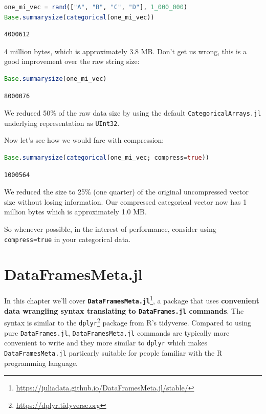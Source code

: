 \documentclass[
  notoc %
]{tufte-book}
\DeclareRobustCommand{\href}[2]{#2\footnote{\url{#1}}}
\newcommand{\passthrough}[1]{#1}
\begin{document}
\begin{lstlisting}[language=Julia]
one_mi_vec = rand(["A", "B", "C", "D"], 1_000_000)
Base.summarysize(categorical(one_mi_vec))
\end{lstlisting}

\begin{lstlisting}
4000612
\end{lstlisting}

4 million bytes, which is approximately 3.8 MB. Don't get us wrong, this
is a good improvement over the raw string size:

\begin{lstlisting}[language=Julia]
Base.summarysize(one_mi_vec)
\end{lstlisting}

\begin{lstlisting}
8000076
\end{lstlisting}

We reduced 50\% of the raw data size by using the default
\passthrough{\lstinline!CategoricalArrays.jl!} underlying representation
as \passthrough{\lstinline!UInt32!}.

Now let's see how we would fare with compression:

\begin{lstlisting}[language=Julia]
Base.summarysize(categorical(one_mi_vec; compress=true))
\end{lstlisting}

\begin{lstlisting}
1000564
\end{lstlisting}

We reduced the size to 25\% (one quarter) of the original uncompressed
vector size without losing information. Our compressed categorical
vector now has 1 million bytes which is approximately 1.0 MB.

So whenever possible, in the interest of performance, consider using
\passthrough{\lstinline!compress=true!} in your categorical data.

\hypertarget{sec:dataframesmeta}{%
\chapter{DataFramesMeta.jl}\label{sec:dataframesmeta}}

In this chapter we'll cover
\href{https://juliadata.github.io/DataFramesMeta.jl/stable/}{\textbf{\passthrough{\lstinline!DataFramesMeta.jl!}}},
a package that uses \textbf{convenient data wrangling syntax translating
to \passthrough{\lstinline!DataFrames.jl!} commands}. The syntax is
similar to the
\href{https://dplyr.tidyverse.org}{\passthrough{\lstinline!dplyr!}}
package from R's tidyverse. Compared to using pure
\passthrough{\lstinline!DataFrames.jl!},
\passthrough{\lstinline!DataFramesMeta.jl!} commands are typically more
convenient to write and they more similar to
\passthrough{\lstinline!dplyr!} which makes
\passthrough{\lstinline!DataFramesMeta.jl!} particarly suitable for
people familiar with the R programming language.
\end{document}
